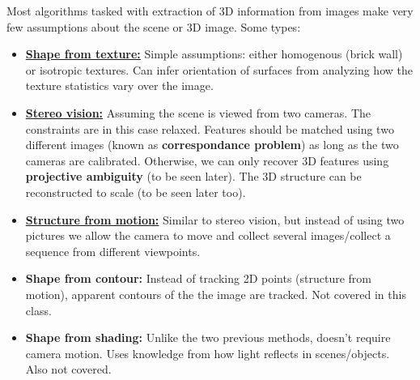 \documentclass[a4paper,11pt]{article}
\begin{document}
Most algorithms tasked with extraction of 3D information from images make very few assumptions about the scene or 3D image. Some types:
\begin{itemize}
	\item \underline{\textbf{Shape from texture:}} Simple assumptions: either homogenous (brick wall) or isotropic textures. Can infer orientation of surfaces from analyzing how the texture statistics vary over the image.
	\item \underline{\textbf{Stereo vision:}} Assuming the scene is viewed from two cameras. The constraints are in this case relaxed. Features should be matched using two different images (known as \textbf{correspondance problem}) as long as the two cameras are calibrated. Otherwise, we can only recover 3D features using \textbf{projective ambiguity} (to be seen later). The 3D structure can be reconstructed to scale (to be seen later too).
	\item \underline{\textbf{Structure from motion:}} Similar to stereo vision, but instead of using two pictures we allow the camera to move and collect several images/collect a sequence from different viewpoints. 
	\item \textbf{Shape from contour: } Instead of tracking 2D points (structure from motion), apparent contours of the the image are tracked. Not covered in this class.
	\item \textbf{Shape from shading:} Unlike the two previous methods, doesn't require camera motion. Uses knowledge from how light reflects in scenes/objects. Also not covered.
\end{itemize}
\end{document}
